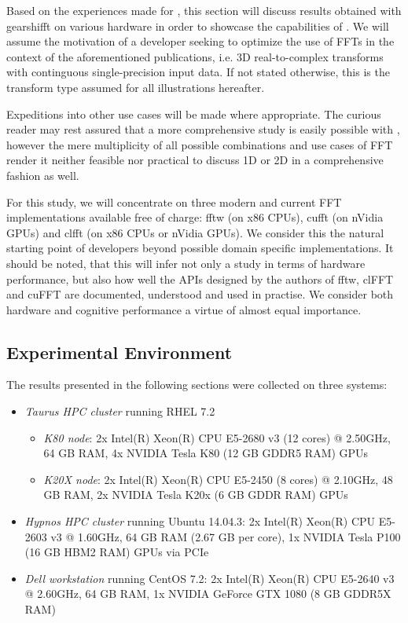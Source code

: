 Based on the experiences made for \cite{preibisch2014efficient, schmid2015real}, this section will discuss results obtained with gearshifft on various hardware in order to showcase the capabilities of \gearshifft{}. We will assume the motivation of a developer seeking to optimize the use of FFTs in the context of the aforementioned publications, i.e. 3D real-to-complex transforms with continguous single-precision input data. If not stated otherwise, this is the transform type assumed for all illustrations hereafter. 

Expeditions into other use cases will be made where appropriate. The curious reader may rest assured that a more comprehensive study is easily possible with \gearshifft{}, however the mere multiplicity of all possible combinations and use cases of FFT render it neither feasible nor practical to discuss 1D or 2D in a comprehensive fashion as well.

For this study, we will concentrate on three modern and current FFT implementations available free of charge: fftw (on x86 CPUs), cufft (on nVidia GPUs) and clfft (on x86 CPUs or nVidia GPUs). We consider this the natural starting point of developers beyond possible domain specific implementations. It should be noted, that this will infer not only a study in terms of hardware performance, but also how well the APIs designed by the authors of fftw, clFFT and cuFFT are documented, understood and used in practise. We consider both hardware and cognitive performance a virtue of almost equal importance.

\subsection{Experimental Environment}
\label{ssec:env}

The results presented in the following sections were collected on three systems:

\begin{itemize}
\item \emph{Taurus HPC cluster}\cite{taurus} running RHEL 7.2
  \begin{itemize}
  \item \emph{K80 node}: 2x Intel(R) Xeon(R) CPU E5-2680 v3 (12 cores) @ 2.50GHz, 64 GB RAM, 4x NVIDIA Tesla K80 (12 GB GDDR5 RAM) GPUs 
  \item \emph{K20X node}: 2x Intel(R) Xeon(R) CPU E5-2450 (8 cores) @ 2.10GHz, 48 GB RAM, 2x NVIDIA Tesla K20x (6 GB GDDR RAM) GPUs 
  \end{itemize}
\item \emph{Hypnos HPC cluster}\cite{hypnos} running Ubuntu 14.04.3:\newline
  2x Intel(R) Xeon(R) CPU E5-2603 v3 @ 1.60GHz, 64 GB RAM (2.67 GB per core), 1x NVIDIA Tesla P100 (16 GB HBM2 RAM) GPUs via PCIe 
\item  \emph{Dell workstation} running CentOS 7.2:\newline 
  2x Intel(R) Xeon(R) CPU E5-2640 v3 @ 2.60GHz, 64 GB RAM, 1x NVIDIA GeForce GTX 1080 (8 GB GDDR5X RAM)
\end{itemize}

